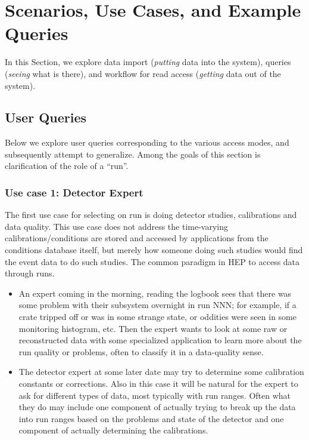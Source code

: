 \documentclass{cmspaper}
\begin{document}
\section{Scenarios, Use Cases, and Example Queries}

In this Section, we explore data import
({\em putting} data into the system), queries ({\em seeing} what is there),
and workflow for read access ({\em getting} data out of the system).

\subsection{User Queries}

Below we explore user queries corresponding to the various access modes,
and subsequently attempt to generalize. Among the goals of this section
is clarification of the role of a ``run''.

\subsubsection{Use case 1: Detector Expert}

  The first use case for selecting on run is doing detector studies, calibrations
and data quality. This use case does not address the time-varying 
calibrations/conditions are stored and accessed by applications from the 
conditions database itself, but merely how someone doing such studies would 
find the event data to do such studies. The common paradigm in HEP to access 
data through runs.
\begin{itemize}
\item An expert coming in the morning, reading the logbook sees that there was
     some problem with their subsystem overnight in run NNN; for example, if a crate 
     tripped off or was in some strange state, or oddities were seen in some 
     monitoring histogram, etc. Then the expert wants to look at some raw or 
     reconstructed data with some specialized application to learn more about the
     run quality or problems, often to classify it in a data-quality sense.
\item The detector expert at some later date may try to determine
     some calibration constants or corrections. Also in this case it will be natural
     for the expert to ask for different types of data, most typically with
     run ranges. Often what they do may include one component of actually 
     trying to break up the data into run ranges based on the problems and
     state of the detector and one component of actually determining the
     calibrations. 
\end{itemize}
\end{document}
